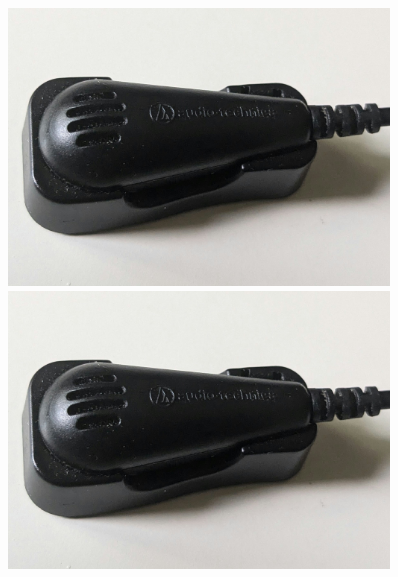 \begin{figure}[h]
    \centering
    \begin{minipage}{.5\textwidth}
      \centering
      \captionsetup{width=0.9\linewidth}
      \includegraphics[width=0.9\textwidth]{images/micro_poussiereux.jpg}
    \end{minipage}%
    \begin{minipage}{.5\textwidth}
      \centering
      \captionsetup{width=0.9\linewidth}
      \includegraphics[width=0.9\textwidth]{images/micro_poussiereux.jpg}
    \end{minipage}
\end{figure}


